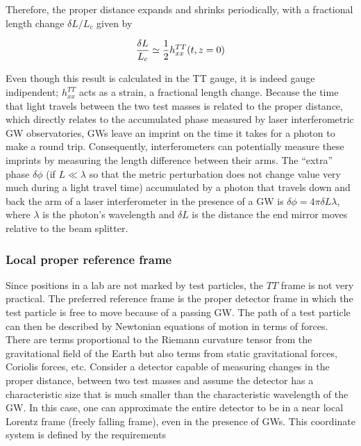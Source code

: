 \documentclass[binding=0.6cm, LaM]{sapthesis}
\begin{document}
	Therefore, the proper distance expands and shrinks periodically, with a fractional length change $\delta L/L_c$ given by

		\begin{equation}
		{{\delta L}\over{L_c}} \simeq {1 \over 2} h_{xx}^{TT}(t,z=0)
		\end{equation}

	Even though this result is calculated in the TT gauge, it is indeed gauge indipendent;
	$h_{xx}^{TT}$ acts as a strain, a fractional length change.
	Because the time that light travels between the two test masses is related to the proper distance,  
	which directly relates to the accumulated phase measured by laser interferometric GW observatories,
	GWs leave an imprint on the time it takes for a photon to make a round trip. 
	Consequently, interferometers can potentially measure these imprints by measuring the length difference between
	their arms. The “extra” phase $\delta \phi$ (if $L \ll \lambda$ so that the metric perturbation 
	does not change value very much during a light travel time) accumulated by a photon that travels
	down and back the arm of a laser interferometer in the presence of a GW is $\delta \phi = 4\pi \delta L \lambda$, 
	where $\lambda$ is the photon’s wavelength and $\delta L$ is the distance
	the end mirror moves relative to the beam splitter.

\subsubsection{Local proper reference frame}

	Since positions in a lab are not marked by test particles,  
	the $TT$ frame is not very practical. 
	The preferred reference frame is the proper detector frame 
	in which the test particle is free to move because of a passing GW. 
	The path of a test particle can then be described by Newtonian equations of motion in terms of forces. 
	There are terms proportional to the Riemann curvature tensor from the gravitational field of the Earth 
	but also terms from static gravitational forces, Coriolis forces, etc. 
	Consider a detector capable of measuring changes in the proper distance, between two test masses
	and assume the detector has a characteristic size that is much smaller 
	than the characteristic wavelength of the GW.
	In this case, one can approximate the entire detector to be in a near local Lorentz frame  
	(freely falling frame), even in the presence of GWs. This coordinate system is defined by the requirements
\end{document}
